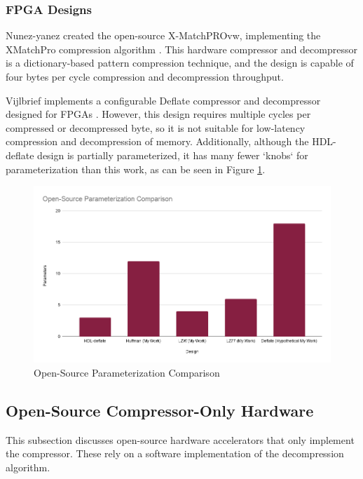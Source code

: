 \documentclass[doublespace,nopageskip]{VTthesis}
\begin{document}
\subsubsection{FPGA Designs}\label{sss:open_fpga_designs}
Nunez-yanez created the open-source X-MatchPROvw, implementing the XMatchPro compression algorithm \cite{xmatchpro}. This hardware compressor and decompressor is a dictionary-based pattern compression technique, and the design is capable of four bytes per cycle compression and decompression throughput.

Vijlbrief implements a configurable Deflate compressor and decompressor designed for FPGAs \cite{hdldeflate}. However, this design requires multiple cycles per compressed or decompressed byte, so it is not suitable for low-latency compression and decompression of memory. Additionally, although the HDL-deflate design is partially parameterized, it has many fewer `knobs` for parameterization than this work, as can be seen in Figure \ref{fig:open-source_parameterization_comparison}.

\begin{figure}[htb]
	\centering
	\includegraphics[scale=0.44]{Open-Source Parameterization Comparison.png}
	\caption{Open-Source Parameterization Comparison}
	\label{fig:open-source_parameterization_comparison}
\end{figure}

\subsection{Open-Source Compressor-Only Hardware}\label{ss:open-source_compressor-only_hardware}
This subsection discusses open-source hardware accelerators that only implement the compressor. These rely on a software implementation of the decompression algorithm.
\end{document}
